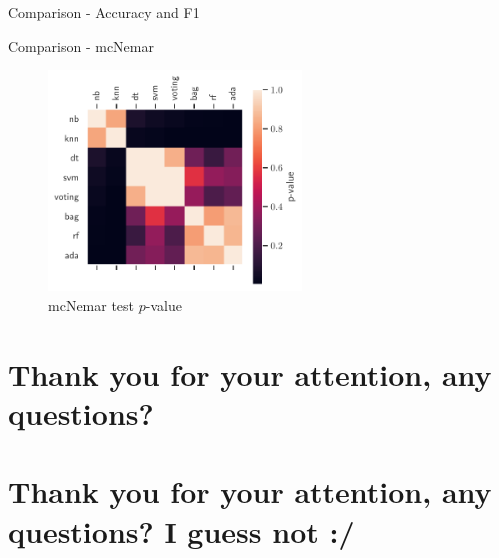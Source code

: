 \documentclass[aspectratio=169]{beamer}
\begin{document}
\begin{frame}{Comparison - Accuracy and F1}
\begin{table}[H]
\centering
\caption{Comparison of metrics}%
\label{tab:comparison}

\end{table}
\end{frame}

\begin{frame}{Comparison - mcNemar}
\begin{figure}[H]
\centering
\includegraphics[width=0.6\textwidth]{chi_mcnemar_pvalue}
\caption{mcNemar test $p$-value}
\end{figure}
\end{frame}

\section{Thank you for your attention, any questions?}
\section{Thank you for your attention, any questions? I guess not :/}
\end{document}
